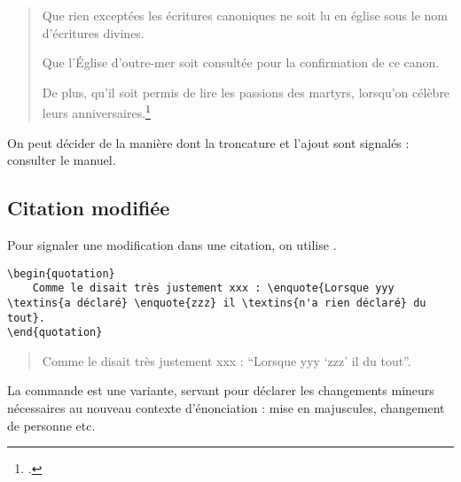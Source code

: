 	\begin{quotation}
	Que rien exceptées les écritures canoniques ne soit lu en église sous le nom d’écritures divines.

Que l’Église d'outre-mer soit consultée pour la confirmation de ce canon.

De plus, qu'il soit permis de lire les passions des martyrs, lorsqu'on célèbre leurs anniversaires.\footcite{BreveHippone}
	\end{quotation}

\begin{anedocte}
On peut décider de la manière dont la troncature et l'ajout sont signalés : consulter le manuel.
\end{anedocte}

\subsection{Citation modifiée}

Pour signaler une modification dans une citation, on utilise  .
\begin{verbatim}
\begin{quotation}
	Comme le disait très justement xxx : \enquote{Lorsque yyy \textins{a déclaré} \enquote{zzz} il \textins{n'a rien déclaré} du tout}.
\end{quotation}
\end{verbatim}

\begin{quotation}
	Comme le disait très justement xxx : \enquote{Lorsque yyy  \enquote{zzz} il  du tout}.
\end{quotation}

La commande  est une variante, servant pour déclarer les changements mineurs nécessaires au nouveau contexte d'énonciation : mise en majuscules, changement de personne etc.
